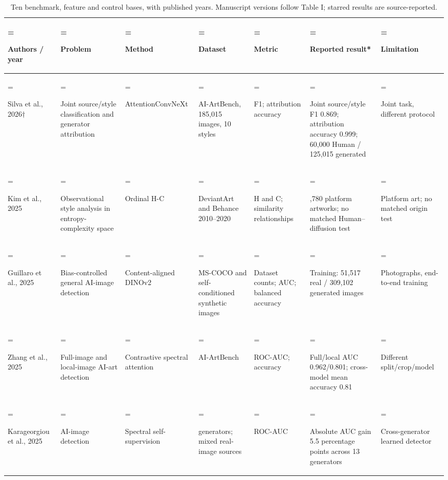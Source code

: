 \begin{table}[t]
\caption{Ten benchmark, feature and control bases, with published years. Manuscript versions follow Table I; starred results are source-reported.}\label{tab:t7}
\centering\fontsize{7.5}{8.6}\selectfont
\setlength{\tabcolsep}{3pt}\renewcommand{\arraystretch}{1.10}
\begin{tabularx}{\textwidth}{>{\hsize=0.824\hsize\linewidth=\hsize\raggedright\arraybackslash}X>{\hsize=0.961\hsize\linewidth=\hsize\raggedright\arraybackslash}X>{\hsize=0.961\hsize\linewidth=\hsize\raggedright\arraybackslash}X>{\hsize=1.098\hsize\linewidth=\hsize\raggedright\arraybackslash}X>{\hsize=0.686\hsize\linewidth=\hsize\raggedright\arraybackslash}X>{\hsize=1.647\hsize\linewidth=\hsize\raggedright\arraybackslash}X>{\hsize=0.824\hsize\linewidth=\hsize\raggedright\arraybackslash}X}
\toprule
\textbf{Authors / year} & \textbf{Problem} & \textbf{Method} & \textbf{Dataset} & \textbf{Metric} & \textbf{Reported result*} & \textbf{Limitation}\\\midrule
{}\cite{p1} Silva et al., 2026$\dagger$ & Joint source/style classification and generator attribution & AttentionConvNeXt & AI-ArtBench, 185,015 images, 10 styles & F1; attribution accuracy & Joint source/style F1 0.869; attribution accuracy 0.999; 60,000 Human / 125,015 generated & Joint task, different protocol\\
{}\cite{p2} Kim et al., 2025 & Observational style analysis in entropy-complexity space & Ordinal H-C & DeviantArt and Behance 2010--2020 & H and C; similarity relationships & 149,780 platform artworks; no matched Human--diffusion test & Platform art; no matched origin test\\
{}\cite{p3} Guillaro et al., 2025 & Bias-controlled general AI-image detection & Content-aligned DINOv2 & MS-COCO and self-conditioned synthetic images & Dataset counts; AUC; balanced accuracy & Training: 51,517 real / 309,102 generated images & Photographs, end-to-end training\\
{}\cite{p4} Zhang et al., 2025 & Full-image and local-image AI-art detection & Contrastive spectral attention & AI-ArtBench & ROC-AUC; accuracy & Full/local AUC 0.962/0.801; cross-model mean accuracy 0.81 & Different split/crop/model\\
{}\cite{p5} Karageorgiou et al., 2025 & AI-image detection & Spectral self-supervision & 13 generators; mixed real-image sources & ROC-AUC & Absolute AUC gain 5.5 percentage points across 13 generators & Cross-generator learned detector\\

\end{tabularx}
\end{table}
